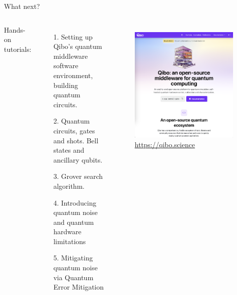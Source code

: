 \documentclass[aspectratio=169, 10pt, xcolor={svgnames}, hyperref={linkcolor=black}]{beamer}
\begin{document}
\begin{frame}{What next?}

  \vspace{0.5cm}
  \begin{columns}
    \column{8cm}
  Hands-on tutorials:
  \begin{enumerate}
    \item[1.] Setting up Qibo’s quantum middleware software environment, building quantum circuits.
    \item[2.] Quantum circuits, gates and shots. Bell states and ancillary qubits.
    \item[3.] Grover search algorithm.
    \item[4.] Introducing quantum noise and quantum hardware limitations
    \item[5.] Mitigating quantum noise via Quantum Error Mitigation
  \end{enumerate}

    \column{5cm}
    \begin{figure}
      \includegraphics[width=\textwidth]{figures/docs.png}
      {\color{blue}\url{https://qibo.science}}
    \end{figure}
  \end{columns}

\end{frame}
\end{document}
